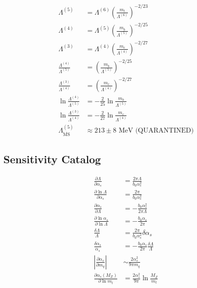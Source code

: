 \documentclass[11pt,a4paper]{article}
\theoremstyle{definition}
\begin{document}
\begin{align}
\label{eq:ext-41}
\Lambda^{(5)} &= \Lambda^{(6)}\left(\frac{m_t}{\Lambda^{(6)}}\right)^{-2/23} \\
\label{eq:ext-42}
\Lambda^{(4)} &= \Lambda^{(5)}\left(\frac{m_b}{\Lambda^{(5)}}\right)^{-2/25} \\
\label{eq:ext-43}
\Lambda^{(3)} &= \Lambda^{(4)}\left(\frac{m_c}{\Lambda^{(4)}}\right)^{-2/27} \\
\label{eq:ext-44}
\frac{\Lambda^{(4)}}{\Lambda^{(5)}} &= \left(\frac{m_b}{\Lambda^{(5)}}\right)^{-2/25} \\
\label{eq:ext-45}
\frac{\Lambda^{(3)}}{\Lambda^{(4)}} &= \left(\frac{m_c}{\Lambda^{(4)}}\right)^{-2/27} \\
\label{eq:ext-46}
\ln\frac{\Lambda^{(4)}}{\Lambda^{(5)}} &= -\frac{2}{25}\ln\frac{m_b}{\Lambda^{(5)}} \\
\label{eq:ext-47}
\ln\frac{\Lambda^{(3)}}{\Lambda^{(4)}} &= -\frac{2}{27}\ln\frac{m_c}{\Lambda^{(4)}} \\
\label{eq:ext-48}
\Lambda_{\overline{\text{MS}}}^{(5)} &\approx 213 \pm 8 \text{ MeV (QUARANTINED)}
\end{align}

\subsection{Sensitivity Catalog}
\label{subsec:ext-sens}

\begin{align}
\label{eq:ext-49}
\frac{\partial\Lambda}{\partial\alpha_s} &= \frac{2\pi\Lambda}{b_0\alpha_s^2} \\
\label{eq:ext-50}
\frac{\partial\ln\Lambda}{\partial\alpha_s} &= \frac{2\pi}{b_0\alpha_s^2} \\
\label{eq:ext-51}
\frac{\partial\alpha_s}{\partial\Lambda} &= -\frac{b_0\alpha_s^2}{2\pi\Lambda} \\
\label{eq:ext-52}
\frac{\partial\ln\alpha_s}{\partial\ln\Lambda} &= -\frac{b_0\alpha_s}{2\pi} \\
\label{eq:ext-53}
\frac{\delta\Lambda}{\Lambda} &= \frac{2\pi}{b_0\alpha_s^2}\delta\alpha_s \\
\label{eq:ext-54}
\frac{\delta\alpha_s}{\alpha_s} &= -\frac{b_0\alpha_s}{2\pi}\frac{\delta\Lambda}{\Lambda} \\
\label{eq:ext-55}
\left|\frac{\partial\alpha_s}{\partial m_q}\right| &\sim \frac{2\alpha_s^2}{9\pi m_q} \\
\label{eq:ext-56}
\frac{\partial\alpha_s(M_Z)}{\partial\ln m_t} &= \frac{2\alpha_s^2}{9\pi}\ln\frac{M_Z}{m_t}
\end{align}
\end{document}
